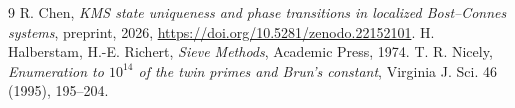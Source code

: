 \documentclass[11pt]{amsart}
\theoremstyle{remark}
\begin{document}
\begin{thebibliography}{9}
 R. Chen, \emph{KMS state uniqueness and phase transitions in localized Bost--Connes systems}, preprint, 2026, \newline\url{https://doi.org/10.5281/zenodo.22152101}.
 H. Halberstam, H.-E. Richert, \emph{Sieve Methods}, Academic Press, 1974.
 T. R. Nicely, \emph{Enumeration to $10^{14}$ of the twin primes and Brun's constant}, Virginia J. Sci. 46 (1995), 195--204.
\end{thebibliography}
\end{document}
